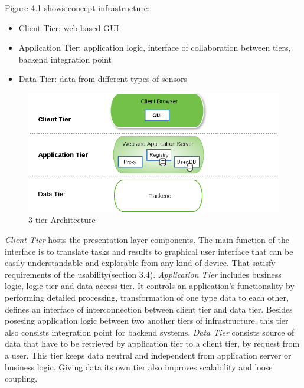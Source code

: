   Figure 4.1 shows concept infrastructure:
  \begin{itemize}
  \item Client Tier: web-based GUI
  \item Application Tier: application logic, interface of collaboration between tiers, backend integration point
  \item Data Tier: data from different types of sensors
  \end{itemize} 
  \begin{figure}[!ht]
  \centering
  \includegraphics[scale=0.7]{images/3tier.png}   
  \caption[3-tier Architecture]{3-tier Architecture}
  \label{img:3-tier Architecture}                           
  \end{figure}

  \emph{Client Tier} hosts the presentation layer components. The main function of the interface is to translate tasks and results to graphical user interface that can be easily understandable and explorable from any kind of device. That satisfy requirements of the usability(section 3.4).
  \newline
  \emph{Application Tier} includes business logic, logic tier and data access tier. It controls an application's functionality by performing detailed processing, transformation of one type data to each other, defines an interface of interconnection between client tier and data tier. Besides posesing application logic between two another tiers of infrastructure, this tier also consists integration point for backend systems.
  \newline
  \emph{Data Tier} consists source of data that have to be retrieved by application tier to a client tier, by request from a user. This tier keeps data neutral and independent from application server or business logic. Giving data its own tier also improves scalability and loose coupling. 
  
